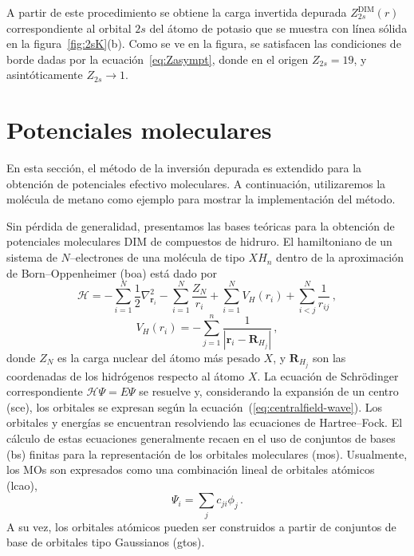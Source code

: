 A partir de este procedimiento se obtiene la carga invertida depurada 
$Z_{2s}^{\mathrm{DIM}}(r)$ correspondiente al orbital $2s$ del átomo 
de potasio que se muestra con línea sólida en la figura~\ref{fig:2sK}(b).
Como se ve en la figura, se satisfacen las condiciones de borde dadas por
la ecuación~\ref{eq:Zasympt}, donde en el origen $Z_{2s} = 19$, y 
asintóticamente $Z_{2s} \rightarrow 1$.

\section{Potenciales moleculares}
\label{sec:potmoleculares}

En esta sección, el método de la inversión depurada es extendido para 
la obtención de potenciales efectivo moleculares. A continuación, 
utilizaremos la molécula de metano como ejemplo para mostrar la 
implementación del método.

Sin pérdida de generalidad, presentamos las bases teóricas para la 
obtención de potenciales moleculares DIM de compuestos de hidruro.
El hamiltoniano de un sistema de $N$--electrones de una molécula de 
tipo $X\!H_n$ dentro de la aproximación de Born--Oppenheimer (\acs{boa})
está dado por
\begin{equation}
 \mathcal{H}=-\sum_{i=1}^N \frac{1}{2} \nabla^2_{\mathbf{r}_i} 
 - \sum_{i=1}^N \frac{Z_N}{r_i} 
 + \sum_{i=1}^N V_H(r_i)
 + \sum_{i<j}^N \frac{1}{r_{ij}}\,,
\end{equation}
\begin{equation}
 V_H(r_i)=-\sum_{j=1}^{n} \frac{1}{\left|\mathbf{r}_i-\mathbf{R}_{H_j}\right|}\,,
\end{equation}
donde $Z_N$ es la carga nuclear del átomo más pesado $X$, y 
$\mathbf{R}_{H_j}$ son las coordenadas de los hidrógenos respecto al 
átomo $X$. La ecuación de Schr\"odinger correspondiente 
$\mathcal{H}\Psi=E\Psi$ se resuelve y, considerando la expansión de un 
centro (\acs{sce}), los orbitales se expresan según la 
ecuación~(\ref{eq:centralfield-wave}). Los orbitales y energías se 
encuentran resolviendo las ecuaciones de Hartree--Fock. El cálculo de 
estas ecuaciones generalmente recaen en el uso de conjuntos de bases 
(\acs{bs}) finitas para la representación de los orbitales moleculares 
(\acsp{mo}). Usualmente, los MOs son expresados como una combinación 
lineal de orbitales atómicos (\acs{lcao}), 
\begin{equation}
 \Psi_i=\sum_j c_{ji} \phi_j\,.
\end{equation}
A su vez, los orbitales atómicos pueden ser construidos a partir de 
conjuntos de base de orbitales tipo Gaussianos (\acsp{gto}).

